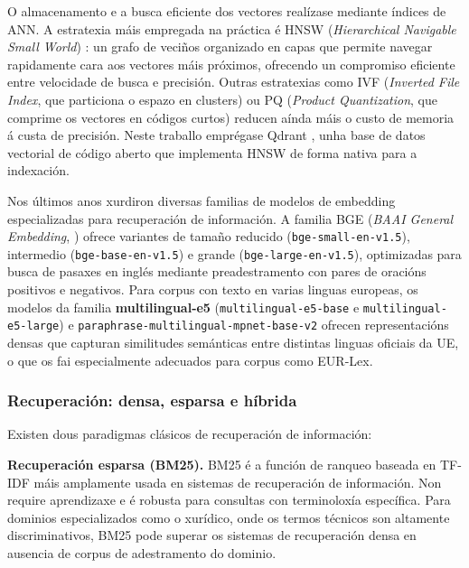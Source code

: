 \documentclass[11pt, a4paper, oneside]{report}
\begin{document}
O almacenamento e a busca eficiente dos vectores realízase mediante índices de \ac{ANN}.
A estratexia máis empregada na práctica é HNSW (\textit{Hierarchical Navigable Small
World}) \citep{malkov2018hnsw}: un grafo de veciños organizado en capas que permite
navegar rapidamente cara aos vectores máis próximos, ofrecendo un compromiso eficiente
entre velocidade de busca e precisión. Outras estratexias como IVF (\textit{Inverted
File Index}, que particiona o espazo en clusters) ou PQ (\textit{Product Quantization},
que comprime os vectores en códigos curtos) reducen aínda máis o custo de memoria á
custa de precisión. Neste traballo emprégase Qdrant \citep{qdrant2024}, unha base de
datos vectorial de código aberto que implementa HNSW de forma nativa para a indexación.

Nos últimos anos xurdiron diversas familias de modelos de embedding especializadas
para recuperación de información. A familia \ac{BGE} (\textit{BAAI General Embedding},
\citealt{xiao2023c}) ofrece variantes de tamaño reducido (\texttt{bge-small-en-v1.5}),
intermedio (\texttt{bge-base-en-v1.5}) e grande (\texttt{bge-large-en-v1.5}),
optimizadas para busca de pasaxes en inglés mediante preadestramento con pares de
oracións positivos e negativos. Para corpus con texto en varias linguas europeas,
os modelos da familia \textbf{multilingual-e5} \citep{wang2022text}
(\texttt{multilingual-e5-base} e \texttt{multilingual-e5-large}) e
\texttt{paraphrase-multilingual-mpnet-base-v2} \citep{reimers2019sentence} ofrecen
representacións densas que capturan similitudes semánticas entre distintas linguas
oficiais da UE, o que os fai especialmente adecuados para corpus como EUR-Lex.

\subsubsection{Recuperación: densa, esparsa e híbrida}
\label{sec:recuperacion_teoria}

Existen dous paradigmas clásicos de recuperación de información:

\textbf{Recuperación esparsa (BM25).} BM25 \citep{robertson2009probabilistic} é a
función de ranqueo baseada en TF-IDF máis amplamente usada en sistemas de recuperación
de información. Non require aprendizaxe e é robusta para consultas con terminoloxía
específica. Para dominios especializados como o xurídico, onde os termos técnicos son
altamente discriminativos, BM25 pode superar os sistemas de recuperación densa en
ausencia de corpus de adestramento do dominio.
\end{document}
